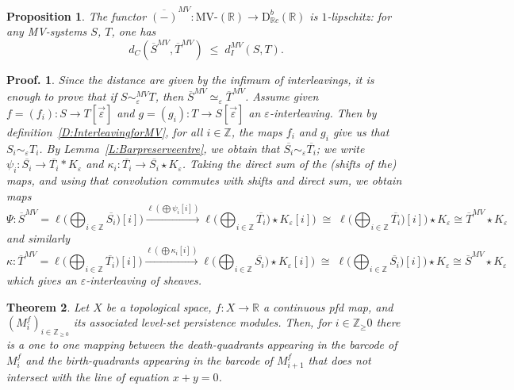 \documentclass[a4paper, english, 11pt]{article}
\newcommand{\0}{\vec{0}}
\newcommand{\R}[0]{\mathbb{R}}
\newcommand{\Z}[0]{\mathbb{Z}}
\newcommand{\D}[0]{\text{D}}
\newtheorem{prop}{Proposition}[section]
\newtheorem*{pf}{Proof.} }
\newtheorem{thm}[prop]{Theorem}
\begin{document}
\begin{prop}\label{P:BarMViso}
The functor $\overline{(-)}^{MV}: \text{MV-}(\R) \to \D^b_{\R c}(\R)$ is $1$-lipschitz: for any MV-systems $S$, $T$, one has
$$d_C(\overline{S}^{MV},\overline{T}^{MV}) \; \leq \; d_I^{MV}( S, T).$$
\end{prop}
\begin{pf}
Since the distance are given by the infimum of interleavings, it is enough to prove that if $S \sim_{\varepsilon}^{MV} T$, then $\overline{S}^{MV} \simeq_{\varepsilon} \overline{T}^{MV}$. 
Assume given $f=(f_i): S\to T[\vec{\varepsilon}] $ and $g=(g_i): T\to S[\vec{\varepsilon}]$ an $\varepsilon$-interleaving.
Then by definition~\ref{D:InterleavingforMV}, for all $i\in \Z$, the maps $f_i$ and $g_i$  give us that    $S_i \sim_{\varepsilon} T_i$. By Lemma~\ref{L:Barpreserveentre}, we obtain that 
$\overline{S_i} \sim_{\varepsilon} \overline{T_i}$; we write $\psi_i: \overline{S_i}\to \overline{T_i}*K_\varepsilon$ and $\kappa_i: \overline{T_i} \to \overline{S_i} \star K_\varepsilon$. Taking the direct sum of the (shifts of the) maps, and using that convolution commutes with shifts and direct sum,  we obtain maps
$$ \Psi: \overline{S}^{MV} =  \ell\Big(\bigoplus_{i\in \Z} \overline{S_i})[i]\Big)\stackrel{\ell(\bigoplus \psi_i [i])}\longrightarrow \ell\Big(\bigoplus_{i\in \Z} \overline{T_i})\star K_\varepsilon[i]\Big) 
\; \cong \; \ell\Big(\bigoplus_{i\in \Z} \overline{T_i})[i]\Big) \star K_\varepsilon 
\cong \overline{T}^{MV}\star K_\varepsilon$$ and similarly
$$\kappa: \overline{T}^{MV} =  \ell\Big(\bigoplus_{i\in \Z} \overline{T_i})[i]\Big)\stackrel{\ell(\bigoplus \kappa_i [i])}\longrightarrow \ell\Big(\bigoplus_{i\in \Z} \overline{S_i})\star K_\varepsilon[i]\Big) 
\; \cong \; \ell\Big(\bigoplus_{i\in \Z} \overline{S_i})[i]\Big) \star K_\varepsilon 
\cong \overline{S}^{MV}\star K_\varepsilon$$ which gives an $\varepsilon$-interleaving of sheaves.
\end{pf}

\begin{thm}
Let $X$ be a topological space, $f: X \to \R$ a continuous pfd map, and $(M_i^f)_{i\in \Z_{\geq 0}}$ its associated level-set persistence modules. Then, for $i\in\Z_\geq 0$ there is a one to one mapping between the death-quadrants appearing in the barcode of $M_i^f$ and the birth-quadrants appearing in the barcode of $M_{i+1}^f$ that does not intersect with the line of equation $x + y = 0$. 
\end{thm}
\end{document}
